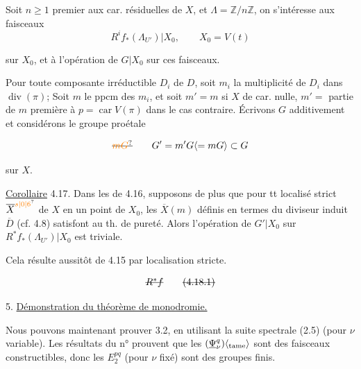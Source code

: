 Soit $n\geq1$ premier aux car. résiduelles de $X$, et  $\Lambda=\mathbb{Z}/n\mathbb{Z}$, on s'intéresse aux faisceaux
\[
R^i f_*(\Lambda_{U'})|X_0,\qquad X_0=V(t)
\]


sur $X_0$, et à l'opération de $G|X_0$ sur ces faisceaux.

Pour toute composante irréductible $D_i$ de $D$, soit $m_i$ la multiplicité de  $D_i$ dans $\operatorname{div}(\pi)$; Soit $m$ le ppcm des $m_i$, et soit $m'=m$ si $X$ de car. nulle, $m'=$ partie de $m$ première à $p=\operatorname{car}V(\pi)$ dans le cas contraire. Écrivons $G$ additivement et considérons le groupe proétale

\[
\deleted{\unsure{mG}}\qquad G'=m'G\inserted{=mG}\subset G
\]

sur $X$. 

\uline{Corollaire} 4.17. Dans les  de 4.16, supposons de plus que pour tt localisé strict $\overline{X}^{\unsure{s|0|6}}$ de $X$ en un point de $X_0$, les $\overline{X}(m)$ définis en termes du diviseur induit $\overline{D}$ (cf. 4.8) satisfont au th. de pureté. Alors l'opération de $G'|X_0$ sur  $R^*f_*(\Lambda_{U'})|X_0$ est triviale.

Cela résulte aussitôt de 4.15 par localisation stricte.


\[
\deleted{R^*f}
\tag*{\deleted{(4.18.1)}}
\]


5. \uline{Démonstration du théorème de monodromie.}

Nous pouvons maintenant prouver 3.2, en utilisant la suite spectrale (2.5)  (pour $\nu$ variable). Les résultats du n°  prouvent que les $(\underline{\Psi}_\nu^q)\inserted{_{\mathrm{tame}}}$ sont des faisceaux constructibles, donc les $E_2^{pq}$  (pour $\nu$ fixé) sont des groupes finis.


